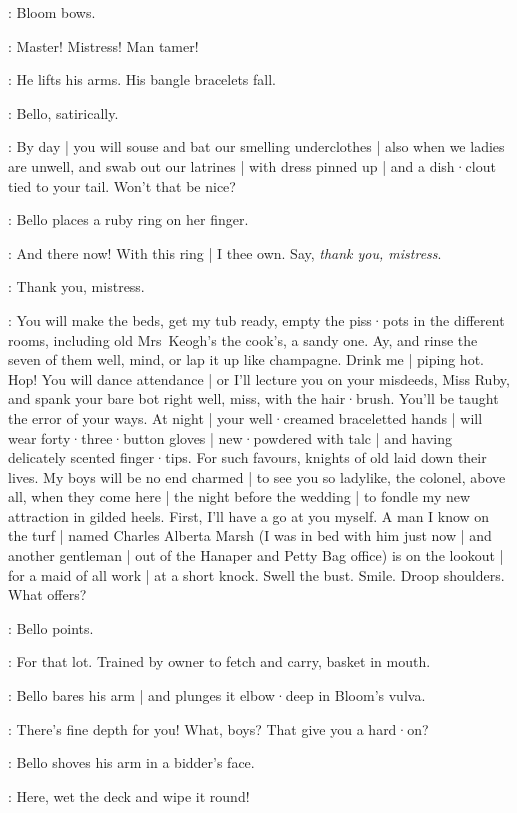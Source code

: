 :
Bloom bows.

\Bloom:
Master!
Mistress!
Man tamer!

:
He lifts his arms.
His bangle bracelets fall.

:
Bello,
satirically.

\Bello:
By day |
you will souse and bat our smelling underclothes |
also when we ladies are unwell,
and swab out our latrines |
with dress pinned up |
and a dish·clout tied to your tail.
Won't that be nice?

:
Bello places a ruby ring on her finger.

\Bello:
And there now!
With this ring |
I thee own.
Say,
\emph{thank you,
mistress}.

\Bloom:
Thank you,
mistress.

\Bello:
You will make the beds,
get my tub ready,
empty the piss·pots in the different rooms,
including old Mrs~Keogh's the cook's,
a sandy one.
Ay,
and rinse the seven of them well,
mind,
or lap it up like champagne.
Drink me |
piping hot.
Hop!
You will dance attendance |
or I'll lecture you on your misdeeds,
Miss Ruby,
and spank your bare bot right well,
miss,
with the hair·brush.
You'll be taught the error of your ways.
At night |
your well·creamed braceletted hands |
will wear forty·three·button gloves |
new·powdered with talc |
and having delicately scented finger·tips.
%
For such favours,
knights of old laid down their lives.
My boys will be no end charmed |
to see you so ladylike,
the colonel,
above all,
when they come here |
the night before the wedding |
to fondle my new attraction in gilded heels.
First,
I'll have a go at you myself.
A man I know on the turf |
named Charles Alberta Marsh
(I was in bed with him just now |
and another gentleman |
out of the Hanaper and Petty Bag office)
is on the lookout |
for a maid of all work |
at a short knock.
Swell the bust.
Smile.
Droop shoulders.
What offers?

:
Bello points.

\Bello:
For that lot.
Trained by owner to fetch and carry,
basket in mouth.

:
Bello bares his arm |
and plunges it elbow·deep in Bloom's vulva.

\Bello:
There's fine depth for you!
What,
boys?
That give you a hard·on?

:
Bello shoves his arm in a bidder's face.

\Bello:
Here,
wet the deck and wipe it round!

